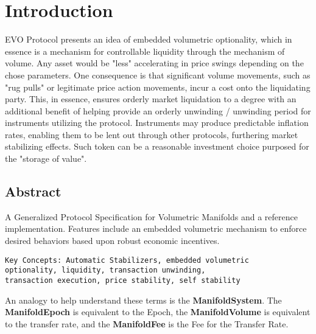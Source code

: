 
\chapter{Introduction}\label{sec:introduction}

EVO Protocol presents an idea of embedded volumetric optionality, which in essence is a mechanism for controllable liquidity through the mechanism of volume. Any asset would be "less" accelerating in price swings depending on the chose parameters. One consequence is that significant volume movements, such as "rug pulls" or legitimate price action movements, incur a cost onto the liquidating party. This, in essence, ensures orderly market liquidation to a degree with an additional benefit of helping provide an orderly unwinding / unwinding period for instruments utilizing the protocol. Instruments may produce predictable inflation rates, enabling them to be lent out through other protocols, furthering market stabilizing effects. Such token can be a reasonable investment choice purposed for the "storage of value".



\section{Abstract}\label{sec:preamble}
A Generalized Protocol Specification for Volumetric Manifolds and a reference implementation. Features include an embedded  volumetric mechanism to enforce desired behaviors based upon robust economic incentives.
\begin{verbatim}
Key Concepts: Automatic Stabilizers, embedded volumetric
optionality, liquidity, transaction unwinding, 
transaction execution, price stability, self stability
 \end{verbatim}

An analogy to help understand these terms is the \textbf{ManifoldSystem}. The \textbf{ManifoldEpoch} is equivalent to the Epoch, the \textbf{ManifoldVolume} is equivalent to the transfer rate, and the \textbf{ManifoldFee} is the Fee for the Transfer Rate. 



